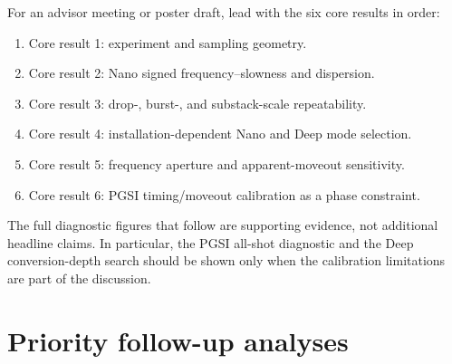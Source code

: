 \documentclass[11pt]{article}
\begin{document}
For an advisor meeting or poster draft, lead with the six core results in order:

\begin{enumerate}[leftmargin=*]
\item Core result 1: experiment and sampling geometry.
\item Core result 2: Nano signed frequency--slowness and dispersion.
\item Core result 3: drop-, burst-, and substack-scale repeatability.
\item Core result 4: installation-dependent Nano and Deep mode selection.
\item Core result 5: frequency aperture and apparent-moveout sensitivity.
\item Core result 6: PGSI timing/moveout calibration as a phase constraint.
\end{enumerate}

The full diagnostic figures that follow are supporting evidence, not additional
headline claims.  In particular, the PGSI all-shot diagnostic and the Deep
conversion-depth search should be shown only when the calibration limitations
are part of the discussion.

\section{Priority follow-up analyses}
\end{document}
